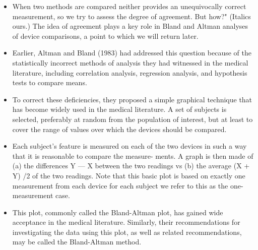 \documentclass[]{article}
\begin{document}
\begin{itemize}
\item When two methods are compared neither provides an unequivocally correct measurement, so we try to assess the degree of agreement. But how?" (Italics ours.) The idea of agreement plays a key role in Bland and Altman analyses of device comparisons, a
point to which we will return later.
\item Earlier, Altman and Bland (1983) had addressed this question because of the statistically incorrect methods of analysis they had witnessed in the medical literature,
including correlation analysis, regression analysis, and hypothesis tests to compare means. 
\item To correct these deﬁciencies, they proposed a simple graphical technique that
has become widely used in the medical literature. A set of subjects is selected, preferably at random from the population of interest, but at least to cover the range of
values over which the devices should be compared. 
\item Each subject’s feature is measured
on each of the two devices in such a way that it is reasonable to compare the measure-
ments. A graph is then made of (a) the differences Y — X between the two readings
vs (b) the average (X + Y) /2 of the two readings. Note that this basic plot is based
on exactly one measurement from each device for each subject we refer to this as
the one-measurement case. 
\item This plot, commonly called the Bland-Altman plot, has
gained wide acceptance in the medical literature. Similarly, their recommendations
for investigating the data using this plot, as well as related recommendations, may
be called the Bland-Altman method.


\end{itemize}
\end{document}
